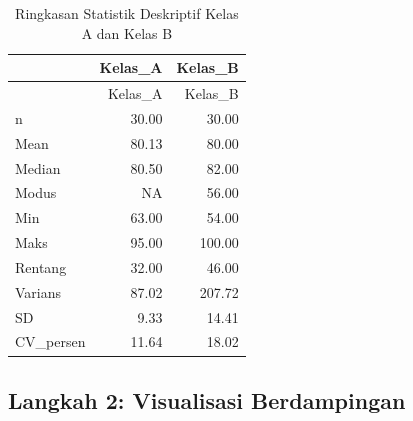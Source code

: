 \documentclass[
  indonesian,
  letterpaper,
]{book}
\begin{document}
\begin{longtable}[]{@{}lrr@{}}
\caption{Ringkasan Statistik Deskriptif Kelas A dan Kelas
B}\tabularnewline
\toprule\noalign{}
& Kelas\_A & Kelas\_B \\
\midrule\noalign{}
\endfirsthead
\toprule\noalign{}
& Kelas\_A & Kelas\_B \\
\midrule\noalign{}
\endhead
\bottomrule\noalign{}
\endlastfoot
n & 30.00 & 30.00 \\
Mean & 80.13 & 80.00 \\
Median & 80.50 & 82.00 \\
Modus & NA & 56.00 \\
Min & 63.00 & 54.00 \\
Maks & 95.00 & 100.00 \\
Rentang & 32.00 & 46.00 \\
Varians & 87.02 & 207.72 \\
SD & 9.33 & 14.41 \\
CV\_persen & 11.64 & 18.02 \\
\end{longtable}

\subsection{Langkah 2: Visualisasi
Berdampingan}\label{langkah-2-visualisasi-berdampingan}
\end{document}
